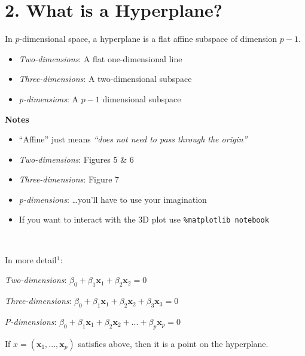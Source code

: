 \documentclass[11pt]{article}
\providecommand{\tightlist}{%
      \setlength{\itemsep}{0pt}\setlength{\parskip}{0pt}}
\begin{document}
    \hypertarget{what-is-a-hyperplane}{%
\section{\texorpdfstring{2. What is a Hyperplane?
}{2. What is a Hyperplane? }}\label{what-is-a-hyperplane}}

In \(p\)-dimensional space, a hyperplane is a flat affine subspace of
dimension \(p-1\).

\begin{itemize}
\tightlist
\item
  \emph{Two-dimensions}: A flat one-dimensional line
\item
  \emph{Three-dimensions}: A two-dimensional subspace
\item
  \emph{p-dimensions}: A \(p-1\) dimensional subspace
\end{itemize}

    \textbf{Notes}

\begin{itemize}
\item
  ``Affine'' just means \emph{``does not need to pass through the
  origin''}
\item
  \emph{Two-dimensions}: Figures 5 \& 6
\item
  \emph{Three-dimensions}: Figure 7
\item
  \emph{p-dimensions}: \ldots you'll have to use your imagination
\item
  If you want to interact with the 3D plot use
  \texttt{\%matplotlib\ notebook}
\end{itemize}

    \begin{center}
    \end{center}
    { \hspace*{\fill} \\}
    
    In more detail\(^1\):

\emph{Two-dimensions}:
\(\beta_0 + \beta_1\mathbf{x}_1 + \beta_2\mathbf{x}_2 = 0\)

\emph{Three-dimensions}:
\(\beta_0 + \beta_1\mathbf{x}_1 + \beta_2\mathbf{x}_2 + \beta_3\mathbf{x}_3 = 0\)

\emph{P-dimensions}:
\(\beta_0 + \beta_1\mathbf{x}_1 + \beta_2\mathbf{x}_2 + ... + \beta_p\mathbf{x}_p = 0\)

    If \(x = (\mathbf{x}_1, ..., \mathbf{x}_p)\) satisfies above, then it is
a point on the hyperplane.
\end{document}
